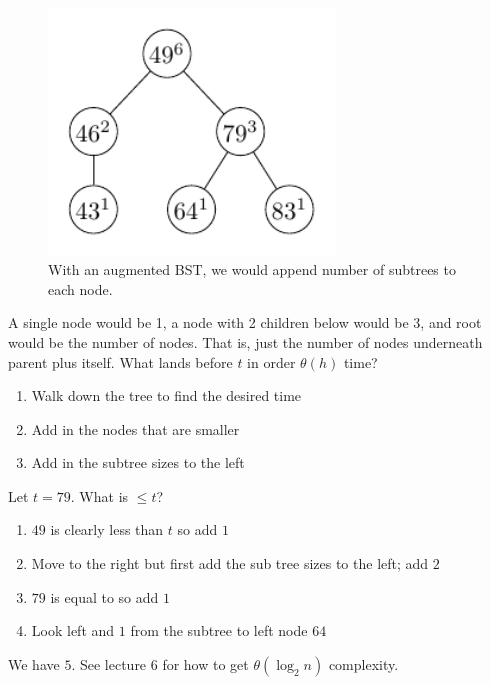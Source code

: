 \begin{figure}[h]
	\centering
	\includegraphics[width=3in]{augmented_bst5.pdf}
	\caption{With an augmented BST, we would append number of subtrees to each node.}
	\label{fig5:augmented_bst}
\end{figure}
A single node would be 1, a node with 2 children below
would be 3, and root would be the number of nodes. That is, just the number of nodes underneath parent plus
itself. What lands before \(t\) in order \(\theta(h)\) time?
\begin{enumerate}
	\item Walk down the tree to find the desired time
	\item Add in the nodes that are smaller
	\item Add in the subtree sizes to the left
\end{enumerate}
Let \(t = 79\). What is \(\leq t\)?
\begin{enumerate}
	\item \(49\) is clearly less than \(t\) so add \(1\)
	\item Move to the right but first add the sub tree sizes to the left; add \(2\)
	\item \(79\) is equal to so add \(1\)
	\item Look left and \(1\) from the subtree to left node \(64\)
\end{enumerate}
We have \(5\). See lecture 6 for how to get \(\theta(\log_2 n)\) complexity.




